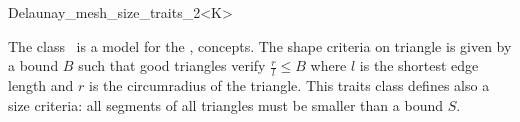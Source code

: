 \begin{ccRefClass}{Delaunay_mesh_size_traits_2<K>}

\ccDefinition
  
The class \ccRefName\ is a model for the ,
concepts. The shape criteria on triangle is given by a bound $B$ such
that good triangles verify $\frac{r}{l} \le B$ where $l$ is the
shortest edge length and $r$ is the circumradius of the
triangle.  This traits class defines also a size criteria: all
segments of all triangles must be smaller than a bound $S$.


\ccIsModel


\ccCreation
{}

\end{ccRefClass}


